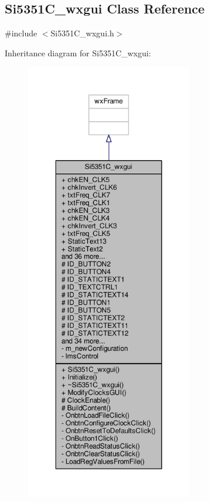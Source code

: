 \subsection{Si5351\+C\+\_\+wxgui Class Reference}
\label{classSi5351C__wxgui}


{\ttfamily \#include $<$Si5351\+C\+\_\+wxgui.\+h$>$}



Inheritance diagram for Si5351\+C\+\_\+wxgui\+:
\nopagebreak
\begin{figure}[H]
\begin{center}
\leavevmode
\includegraphics[height=550pt]{dc/d83/classSi5351C__wxgui__inherit__graph}
\end{center}
\end{figure}


